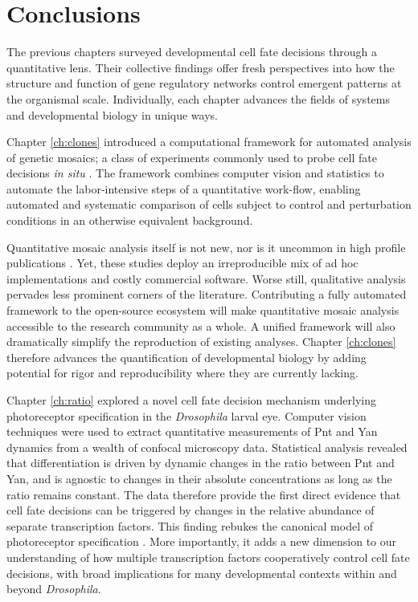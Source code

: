 \chapter{Conclusions}
\label{ch:conclusion}

The previous chapters surveyed developmental cell fate decisions through a quantitative lens. Their collective findings offer fresh perspectives into how the structure and function of gene regulatory networks control emergent patterns at the organismal scale. Individually, each chapter advances the fields of systems and developmental biology in unique ways.

Chapter \ref{ch:clones} introduced a computational framework for automated analysis of genetic mosaics; a class of experiments commonly used to probe cell fate decisions \textit{in situ} \cite{Germani2018,Atkins2019}. The framework combines computer vision and statistics to automate the labor-intensive steps of a quantitative work-flow, enabling automated and systematic comparison of cells subject to control and perturbation conditions in an otherwise equivalent background.

Quantitative mosaic analysis itself is not new, nor is it uncommon in high profile publications \cite{Dai2017,Gavish2016,Li2018}. Yet, these studies deploy an irreproducible mix of ad hoc implementations and costly commercial software. Worse still, qualitative analysis pervades less prominent corners of the literature. Contributing a fully automated framework to the open-source ecosystem will make quantitative mosaic analysis accessible to the research community as a whole. A unified framework will also dramatically simplify the reproduction of existing analyses. Chapter \ref{ch:clones} therefore advances the quantification of developmental biology by adding potential for rigor and reproducibility where they are currently lacking.

Chapter \ref{ch:ratio} explored a novel cell fate decision mechanism underlying photoreceptor specification in the \textit{Drosophila} larval eye. Computer vision techniques were used to extract quantitative measurements of Pnt and Yan dynamics from a wealth of confocal microscopy data. Statistical analysis revealed that differentiation is driven by dynamic changes in the ratio between Pnt and Yan, and is agnostic to changes in their absolute concentrations as long as the ratio remains constant. The data therefore provide the first direct evidence that cell fate decisions can be triggered by changes in the relative abundance of separate transcription factors. This finding rebukes the canonical model of photoreceptor specification \cite{Graham2010}. More importantly, it adds a new dimension to our understanding of how multiple transcription factors cooperatively control cell fate decisions, with broad implications for many developmental contexts within and beyond \textit{Drosophila}. 

